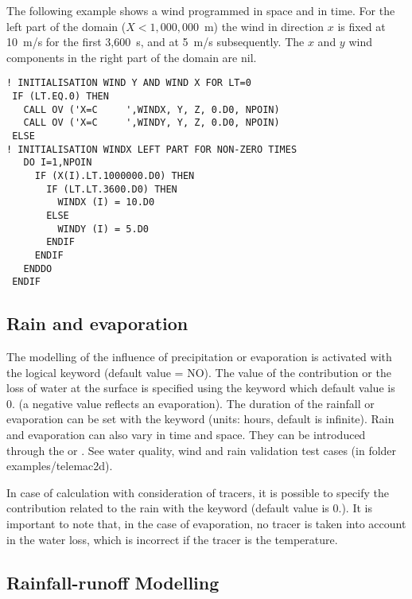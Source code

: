 The following example shows a wind programmed in space and in time.
For the left part of the domain ($ X < 1,000,000$~m) the wind in direction $x$
is fixed at 10~m/s for the first 3,600~s, and at 5~m/s subsequently.
The $x$ and $y$ wind components in the right part of the domain are nil.

\begin{lstlisting}[language=TelFortran]
! INITIALISATION WIND Y AND WIND X FOR LT=0
 IF (LT.EQ.0) THEN
   CALL OV ('X=C     ',WINDX, Y, Z, 0.D0, NPOIN)
   CALL OV ('X=C     ',WINDY, Y, Z, 0.D0, NPOIN)
 ELSE
! INITIALISATION WINDX LEFT PART FOR NON-ZERO TIMES
   DO I=1,NPOIN
     IF (X(I).LT.1000000.D0) THEN
       IF (LT.LT.3600.D0) THEN
         WINDX (I) = 10.D0
       ELSE
         WINDY (I) = 5.D0
       ENDIF
     ENDIF
   ENDDO
 ENDIF
\end{lstlisting}

\subsection{Rain and evaporation}

The modelling of the influence of precipitation or evaporation is activated
with the logical keyword  (default value = NO).
The value of the contribution or the loss of water at the surface is specified
using the keyword  which default value
is 0. (a negative value reflects an evaporation).
The duration of the rainfall or evaporation can be set with the keyword
 (units: hours, default is
infinite).
Rain and evaporation can also vary in time and space.
They can be introduced through the 
or .
See water quality, wind and rain validation test cases (in folder
examples/telemac2d).

In case of calculation with consideration of tracers, it is possible to specify
the contribution related to the rain with the keyword
 (default value is 0.).
It is important to note that, in the case of evaporation, no tracer is taken
into account in the water loss, which is incorrect if the tracer is the
temperature.

\subsection{Rainfall-runoff Modelling}


